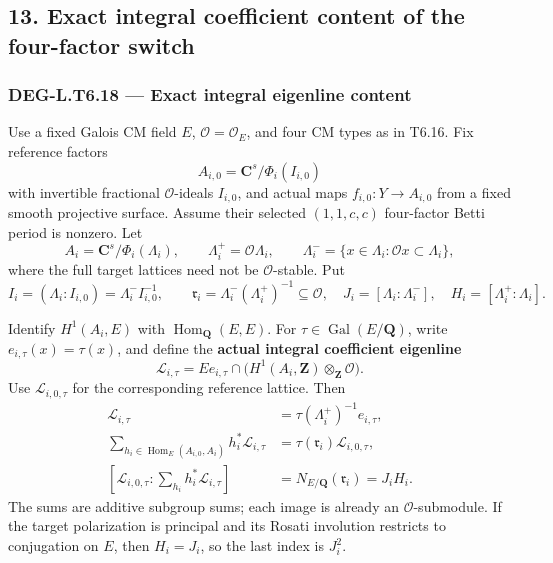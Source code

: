 \subsection{13. Exact integral coefficient content of the four-factor switch}\label{exact-integral-coefficient-content-of-the-four-factor-switch}

\subsubsection{DEG-L.T6.18 --- Exact integral eigenline content}\label{DEG-L.T6.18}

Use a fixed Galois CM field \(E\), \(\mathcal O=\mathcal O_E\), and four CM types as in T6.16. Fix reference factors \[
A_{i,0}=\mathbf C^s/\Phi_i(I_{i,0})
\] with invertible fractional \(\mathcal O\)-ideals \(I_{i,0}\), and actual maps \(f_{i,0}:Y\to A_{i,0}\) from a fixed smooth projective surface. Assume their selected \((1,1,c,c)\) four-factor Betti period is nonzero. Let \[
A_i=\mathbf C^s/\Phi_i(\Lambda_i),\qquad
\Lambda_i^+=\mathcal O\Lambda_i,\qquad
\Lambda_i^-=\{x\in\Lambda_i:\mathcal O x\subset\Lambda_i\},
\] where the full target lattices need not be \(\mathcal O\)-stable. Put \[
I_i=(\Lambda_i:I_{i,0})=\Lambda_i^-I_{i,0}^{-1},\qquad
\mathfrak r_i=\Lambda_i^-(\Lambda_i^+)^{-1}\subseteq\mathcal O,
\quad J_i=[\Lambda_i:\Lambda_i^-],\quad H_i=[\Lambda_i^+:\Lambda_i].
\tag{T18.1}
\]

Identify \(H^1(A_i,E)\) with \(\operatorname{Hom}_{\mathbf Q}(E,E)\). For \(\tau\in\operatorname{Gal}(E/\mathbf Q)\), write \(e_{i,\tau}(x)=\tau(x)\), and define the \textbf{actual integral coefficient eigenline} \[
\mathcal L_{i,\tau}
=Ee_{i,\tau}\cap\bigl(H^1(A_i,\mathbf Z)\otimes_{\mathbf Z}\mathcal O\bigr).
\tag{T18.2}
\] Use \(\mathcal L_{i,0,\tau}\) for the corresponding reference lattice. Then \[
\begin{aligned}
\mathcal L_{i,\tau}
&=\tau(\Lambda_i^+)^{-1}e_{i,\tau},\\
\sum_{h_i\in\operatorname{Hom}_E(A_{i,0},A_i)}h_i^*\mathcal L_{i,\tau}
&=\tau(\mathfrak r_i)\mathcal L_{i,0,\tau},\\
[\mathcal L_{i,0,\tau}:\sum_{h_i}h_i^*\mathcal L_{i,\tau}]
&=N_{E/\mathbf Q}(\mathfrak r_i)=J_iH_i.
\end{aligned}
\tag{T18.3}
\] The sums are additive subgroup sums; each image is already an \(\mathcal O\)-submodule. If the target polarization is principal and its Rosati involution restricts to conjugation on \(E\), then \(H_i=J_i\), so the last index is \(J_i^2\).

